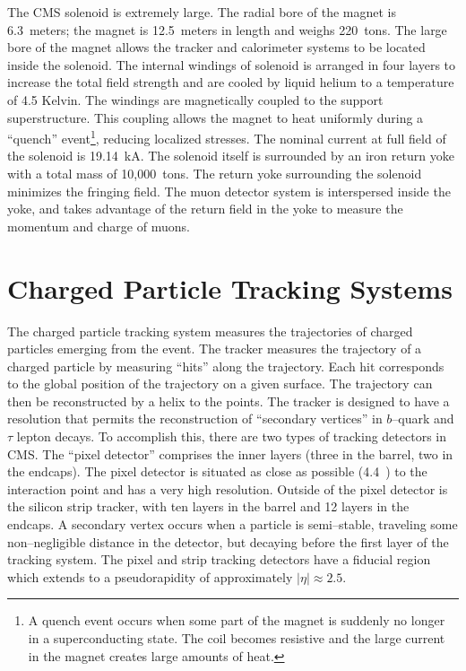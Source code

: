 The CMS solenoid is extremely large.  The radial bore of the magnet is
6.3~meters; the magnet is 12.5~meters in length and weighs 220~tons.  The large
bore of the magnet allows the tracker and calorimeter systems to be located
inside the solenoid.  The internal windings of solenoid is arranged in four
layers to increase the total field strength and are cooled by liquid helium to
a temperature of 4.5 Kelvin.  The windings are magnetically
coupled to the support superstructure.  This coupling allows the magnet to
heat uniformly during a ``quench'' event\footnote{A quench event occurs when some part
of the magnet is suddenly no longer in a superconducting state.  The coil
becomes resistive and the large current in the magnet creates large amounts of
heat.}, reducing localized stresses.  The
nominal current at full field of the solenoid is 19.14~kA.  The solenoid itself
is surrounded by an iron return yoke with a total mass of 10,000~tons.  The
return yoke surrounding the solenoid minimizes the fringing field.  The muon
detector system is interspersed inside the yoke, and takes advantage of the
return field in the yoke to measure the momentum and charge of muons.
%
\section{Charged Particle Tracking Systems}
\label{sec:Tracker}

The charged particle tracking system measures the trajectories of charged
particles emerging from the event.  The tracker measures the trajectory of a
charged particle by measuring ``hits'' along the trajectory.  Each hit
corresponds to the global position of the trajectory on a given surface.  The
trajectory can then be reconstructed by a helix to the points.  The tracker is
designed to have a resolution that permits the reconstruction of ``secondary
vertices'' in $b$--quark and $\tau$ lepton decays.  To accomplish this, there
are two types of tracking detectors in CMS\@.  The ``pixel detector'' comprises
the inner layers (three in the barrel, two in the endcaps).  The pixel detector
is  situated as close as possible (4.4~\cm) to the interaction point and has a
very high resolution. Outside of the pixel detector is the silicon strip
tracker, with ten layers in the barrel and 12 layers in the endcaps.  A
secondary vertex occurs when a particle is semi--stable, traveling some
non--negligible distance in the detector, but decaying before the first layer of
the tracking system.  The pixel and strip tracking detectors have a fiducial
region which extends to a pseudorapidity of approximately $|\eta| \approx 2.5$.

